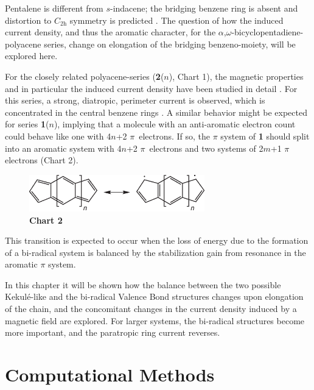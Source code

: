 Pentalene is different from $s$-indacene; the bridging benzene ring is absent and distortion to $C_\mathrm{2h}$ symmetry is predicted  \cite{r16,r17}. The question of how the induced current density, and thus the aromatic character, for the $\alpha$,$\omega$-bicyclopentadiene-polyacene series, change on elongation of the bridging benzeno-moiety, will be explored here.

For the closely related polyacene-series (\textbf{2}($n$), Chart 1), the magnetic properties and in particular the induced current density have been studied in detail  \cite{r18,r19}. For this series, a strong, diatropic, perimeter current is observed, which is concentrated in the central benzene rings  \cite{r18}. A similar behavior might be expected for series \textbf{1}($n$), implying that a molecule with an anti-aromatic electron count could behave like one with 4$n$+2 \mbox{$\pi$ electrons}. If so, the $\pi$ system of \textbf{1} should split into an aromatic system with 4$n$+2 \mbox{$\pi$ electrons} and two systems of 2$m$+1 $\pi$ electrons (Chart 2).
\begin{figure}[htp]
\center
\includegraphics[width=3in]{indacene/figures/chart2.eps}\\
\textbf{Chart 2}
\end{figure}
This transition is expected to occur when the loss of energy due to the formation of a bi-radical system is balanced by the stabilization gain from resonance in the aromatic $\pi$ system.

In this chapter it will be shown how the balance between the two possible Kekul\'e-like and the bi-radical Valence Bond structures changes upon elongation of the chain, and the
concomitant changes in the current density induced by a magnetic field are explored. For larger systems, the bi-radical structures become more important, and the paratropic ring current reverses.

\section{Computational Methods}

